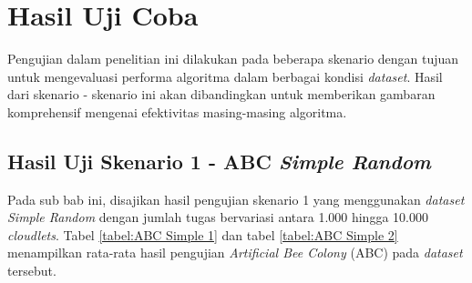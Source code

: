 \section{Hasil Uji Coba}
Pengujian dalam penelitian ini dilakukan pada beberapa skenario dengan tujuan untuk mengevaluasi performa algoritma dalam berbagai kondisi \textit{dataset}. Hasil dari skenario - skenario ini akan dibandingkan untuk memberikan gambaran komprehensif mengenai efektivitas masing-masing algoritma.

\subsection{Hasil Uji Skenario 1 - ABC \textit{Simple Random}}
Pada sub bab ini, disajikan hasil pengujian skenario 1 yang menggunakan \textit{dataset Simple Random} dengan jumlah tugas bervariasi antara 1.000 hingga 10.000 \textit{cloudlets}. Tabel \ref{tabel:ABC Simple 1} dan tabel \ref{tabel:ABC Simple 2} menampilkan rata-rata hasil pengujian \textit{Artificial Bee Colony} (ABC) pada \textit{dataset} tersebut.

